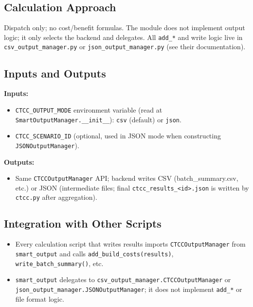 \documentclass[ctcc_full_documentation.tex]{subfiles}
\begin{document}
\subsection{Calculation Approach}

Dispatch only; no cost/benefit formulas. The module does not implement output logic; it only selects the backend and delegates. All \texttt{add\_*} and write logic live in \texttt{csv\_output\_manager.py} or \texttt{json\_output\_manager.py} (see their documentation).

\subsection{Inputs and Outputs}

\textbf{Inputs:}
\begin{itemize}
    \item \texttt{CTCC\_OUTPUT\_MODE} environment variable (read at \texttt{SmartOutputManager.\_\_init\_\_}): \texttt{csv} (default) or \texttt{json}.
    \item \texttt{CTCC\_SCENARIO\_ID} (optional, used in JSON mode when constructing \texttt{JSONOutputManager}).
\end{itemize}

\textbf{Outputs:}
\begin{itemize}
    \item Same \texttt{CTCCOutputManager} API; backend writes CSV (batch\_summary.csv, etc.) or JSON (intermediate files; final \texttt{ctcc\_results\_<id>.json} is written by \texttt{ctcc.py} after aggregation).
\end{itemize}

\subsection{Integration with Other Scripts}

\begin{itemize}
    \item Every calculation script that writes results imports \texttt{CTCCOutputManager} from \texttt{smart\_output} and calls \texttt{add\_build\_costs(results)}, \texttt{write\_batch\_summary()}, etc.
    \item \texttt{smart\_output} delegates to \texttt{csv\_output\_manager.CTCCOutputManager} or \texttt{json\_output\_manager.JSONOutputManager}; it does not implement \texttt{add\_*} or file format logic.
\end{itemize}
\end{document}
